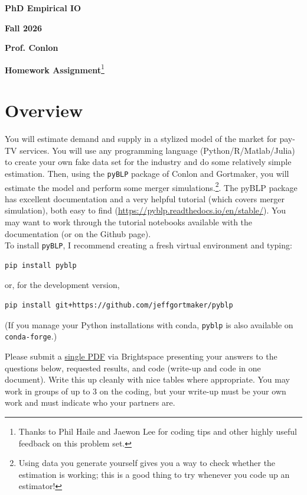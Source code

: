 \documentclass[english,11pt]{article}
\begin{document}
\begin{center}
\textbf{PhD Empirical IO}

\textbf{Fall 2026}

\textbf{Prof. Conlon}

\textbf{Homework Assignment}\footnote{Thanks to Phil Haile and Jaewon Lee for coding tips and other highly useful feedback on this problem set.}


\end{center}

\bigskip

\section*{Overview}

You will estimate demand and supply in a stylized model of the market for
pay-TV services. You will use any programming language (Python/R/Matlab/Julia) to create your own fake data set for the industry and do some
relatively simple estimation. Then, using the \texttt{pyBLP} package of Conlon and Gortmaker, you will
estimate the model and perform some merger simulations.\footnote{%
Using data you generate yourself gives you a way to check whether the
estimation is working; this is a good thing to try whenever you code up an
estimator!}. The pyBLP package has excellent
documentation and a very helpful tutorial (which covers merger simulation),
both easy to find (\url{https://pyblp.readthedocs.io/en/stable/}). You may want to work through the tutorial notebooks available with the documentation (or on the Github page).\\


To install \texttt{pyBLP}, I recommend creating a fresh virtual environment and typing:
\begin{verbatim}
pip install pyblp
\end{verbatim}
or, for the development version,
\begin{verbatim}
pip install git+https://github.com/jeffgortmaker/pyblp
\end{verbatim}
(If you manage your Python installations with conda, \texttt{pyblp} is also available on \texttt{conda-forge}.)

Please submit a \underline{single PDF} via Brightspace presenting your answers to the questions below,
requested results, and code (write-up and code in one document). Write this up cleanly with nice tables where appropriate.
You may work in groups of up to 3 on the coding, but your write-up must be your own work and must indicate who your partners are.
\end{document}

